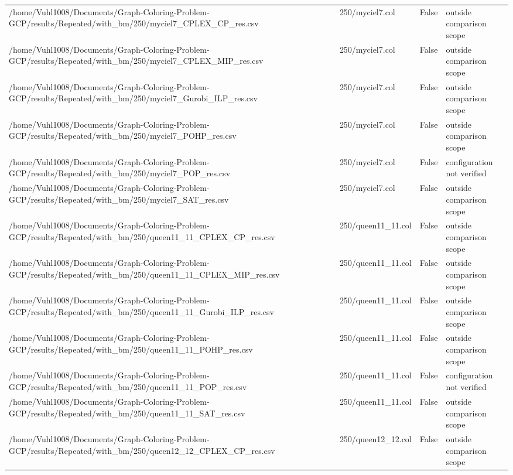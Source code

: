 \begin{table}[htbp]
\begin{tabular}{llll}
/home/Vuhl1008/Documents/Graph-Coloring-Problem-GCP/results/Repeated/with\_bm/250/myciel7\_CPLEX\_CP\_res.csv & 250/myciel7.col & False & outside comparison scope \\
/home/Vuhl1008/Documents/Graph-Coloring-Problem-GCP/results/Repeated/with\_bm/250/myciel7\_CPLEX\_MIP\_res.csv & 250/myciel7.col & False & outside comparison scope \\
/home/Vuhl1008/Documents/Graph-Coloring-Problem-GCP/results/Repeated/with\_bm/250/myciel7\_Gurobi\_ILP\_res.csv & 250/myciel7.col & False & outside comparison scope \\
/home/Vuhl1008/Documents/Graph-Coloring-Problem-GCP/results/Repeated/with\_bm/250/myciel7\_POHP\_res.csv & 250/myciel7.col & False & outside comparison scope \\
/home/Vuhl1008/Documents/Graph-Coloring-Problem-GCP/results/Repeated/with\_bm/250/myciel7\_POP\_res.csv & 250/myciel7.col & False & configuration not verified \\
/home/Vuhl1008/Documents/Graph-Coloring-Problem-GCP/results/Repeated/with\_bm/250/myciel7\_SAT\_res.csv & 250/myciel7.col & False & outside comparison scope \\
/home/Vuhl1008/Documents/Graph-Coloring-Problem-GCP/results/Repeated/with\_bm/250/queen11\_11\_CPLEX\_CP\_res.csv & 250/queen11\_11.col & False & outside comparison scope \\
/home/Vuhl1008/Documents/Graph-Coloring-Problem-GCP/results/Repeated/with\_bm/250/queen11\_11\_CPLEX\_MIP\_res.csv & 250/queen11\_11.col & False & outside comparison scope \\
/home/Vuhl1008/Documents/Graph-Coloring-Problem-GCP/results/Repeated/with\_bm/250/queen11\_11\_Gurobi\_ILP\_res.csv & 250/queen11\_11.col & False & outside comparison scope \\
/home/Vuhl1008/Documents/Graph-Coloring-Problem-GCP/results/Repeated/with\_bm/250/queen11\_11\_POHP\_res.csv & 250/queen11\_11.col & False & outside comparison scope \\
/home/Vuhl1008/Documents/Graph-Coloring-Problem-GCP/results/Repeated/with\_bm/250/queen11\_11\_POP\_res.csv & 250/queen11\_11.col & False & configuration not verified \\
/home/Vuhl1008/Documents/Graph-Coloring-Problem-GCP/results/Repeated/with\_bm/250/queen11\_11\_SAT\_res.csv & 250/queen11\_11.col & False & outside comparison scope \\
/home/Vuhl1008/Documents/Graph-Coloring-Problem-GCP/results/Repeated/with\_bm/250/queen12\_12\_CPLEX\_CP\_res.csv & 250/queen12\_12.col & False & outside comparison scope \\

\end{tabular}
\end{table}
